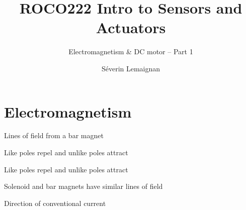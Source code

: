 \documentclass[compress]{beamer}
\title{ROCO222 \newline Intro to Sensors and Actuators}
\subtitle{Electromagnetism \& DC motor -- Part 1}
\date{}
\author{Séverin Lemaignan}
\institute{Centre for Robotics and Neural Systems\\{\bf Plymouth University}}
\begin{document}



\maketitle


\section{Electromagnetism}


{
    \begin{frame}{Lines of field from a bar magnet}
    \end{frame}
}


    \begin{frame}{Like poles repel and unlike poles attract}
    \end{frame}


{
    \begin{frame}{Like poles repel and unlike poles attract}
    \end{frame}
}



{
    \begin{frame}{Solenoid and bar magnets have similar lines of field}
    \end{frame}
}


{
    \begin{frame}{Direction of conventional current}
    \end{frame}
}

\end{document}
